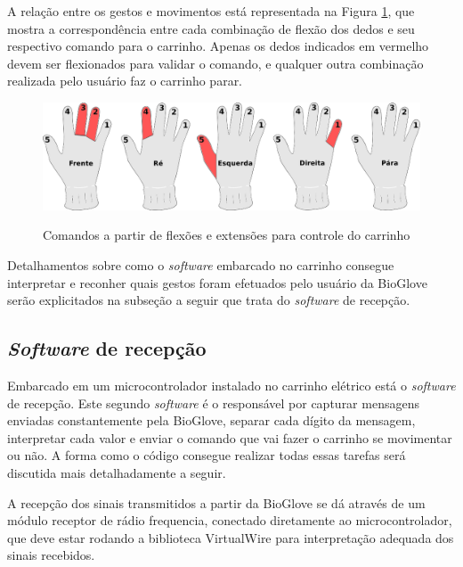 \documentclass[
	12pt,				%
	openright,			%
	oneside,			%
	a4paper,			%
	english,			%
	brazil				%
	]{abntex2}
\begin{document}
		A relação entre os gestos e movimentos está representada na Figura \ref{Fig:glove-control-positions1}, que mostra a correspondência entre cada combinação de flexão dos dedos e seu respectivo comando para o carrinho. Apenas os dedos indicados em vermelho devem ser flexionados para validar o comando, e qualquer outra combinação realizada pelo usuário faz o carrinho parar.


		\begin{figure}[h!]
			\centering
			\caption{Comandos a partir de flexões e extensões para controle do carrinho}
  		\includegraphics[width=14cm]{./figures/glove-control-positions1.png}
  		\label{Fig:glove-control-positions1}
		\end{figure}

		Detalhamentos sobre como o \textit{software} embarcado no carrinho consegue interpretar e reconher quais gestos foram efetuados pelo usuário da BioGlove serão explicitados na subseção a seguir que trata do \textit{software} de recepção.



	

		
		\subsection{\textit{Software} de recepção}


		Embarcado em um microcontrolador instalado no carrinho elétrico está o \textit{software} de recepção. Este segundo \textit{software} é o responsável por capturar mensagens enviadas constantemente pela BioGlove, separar cada dígito da mensagem, interpretar cada valor e enviar o comando que vai fazer o carrinho se movimentar ou não. A forma como o código consegue realizar todas essas tarefas será discutida mais detalhadamente a seguir.
		
		A recepção dos sinais transmitidos a partir da BioGlove se dá através de um módulo receptor de rádio frequencia, conectado diretamente ao microcontrolador, que deve estar rodando a biblioteca VirtualWire para interpretação adequada dos sinais recebidos.
\end{document}
